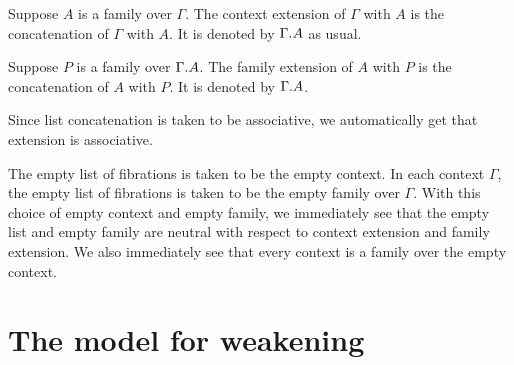 \begin{defn}
Suppose $A$ is a family over $\Gamma$. The context extension of $\Gamma$ with $A$ is the concatenation of $\Gamma$ with $A$. It is denoted by $\ctxext{\Gamma}{A}$ as usual.
\end{defn}

\begin{defn}
Suppose $P$ is a family over $\ctxext{\Gamma}{A}$. The family extension of $A$ with $P$ is the concatenation of $A$ with $P$. It is denoted by $\ctxext{\Gamma}{A}$. 
\end{defn}

Since list concatenation is taken to be associative, we automatically get that extension is associative. 

\begin{defn}
The empty list of fibrations is taken to be the empty context. In each context $\Gamma$, the empty list of fibrations is taken to be the empty family over $\Gamma$. With this choice of empty context and empty family, we immediately see that the empty list and empty family are neutral with respect to context extension and family extension. We also immediately see that every context is a family over the empty context. 
\end{defn}

\section{The model for weakening}

\begin{defn}

\end{defn}

